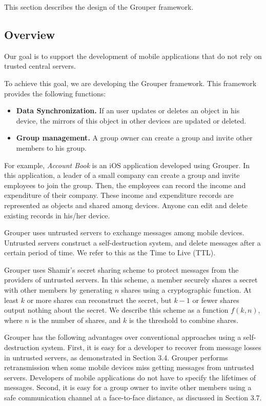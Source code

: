 \documentclass{sig-alternate-05-2015}
\begin{document}
This section describes the design of the Grouper framework.

\subsection{Overview}

Our goal is to support the development of mobile applications that do not rely on trusted central servers.

To achieve this goal, we are developing the Grouper framework.
This framework provides the following functions:

\begin{itemize}[leftmargin=7mm]
	\setlength{\itemsep}{1pt}
	\setlength{\parskip}{0pt}
	\setlength{\parsep}{0pt}
	\item \textbf{Data Synchronization.} 
	If an user updates or deletes an object in his device, the mirrors of this object in other devices are updated or deleted.
	\item \textbf{Group management.} 
	A group owner can create a group and invite other members to his group.
\end{itemize}

For example, \emph{Account Book} is an iOS application developed using Grouper. 
In this application, a leader of a small company can create a group and invite employees to join the group. 
Then, the employees can record the income and expenditure of their company.
These income and expenditure records are represented as objects and shared among devices.
Anyone can edit and delete existing records in his/her device.

Grouper uses untrusted servers to exchange messages among mobile devices.
Untrusted servers construct a self-destruction system, and delete messages after a certain period of time.
We refer to this as the Time to Live (TTL).

Grouper uses Shamir's secret sharing scheme to protect messages from the providers of untrusted servers.
In this scheme, a member securely shares a secret with other members by generating $n$ shares using a cryptographic function\cite{smith2013layered}. 
At least $k$ or more shares can reconstruct the secret, but $k-1$ or fewer shares output nothing about the secret\cite{pang2005new}. 
We describe this scheme as a function ${f(k, n)}$, where $n$ is the number of shares, and $k$ is the threshold to combine shares. 

Grouper has the following advantages over conventional approaches using a self-destruction system.
First, it is easy for a developer to recover from message losses in untrusted servers, as demonstrated in Section 3.4.
Grouper performs retransmission when some mobile devices miss getting messages from untrusted servers.
Developers of mobile applications do not have to specify the lifetimes of messages.
Second, it is easy for a group owner to invite other members using a safe communication channel at a face-to-face distance, as discussed in Section 3.7.
\end{document}
